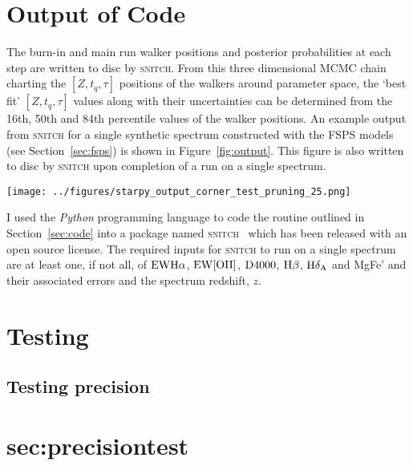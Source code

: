 \documentclass[useAMS,usenatbib]{mn2e}
\begin{document}
\section{Output of Code}\label{sec:output}

The burn-in and main run walker positions and posterior probabilities at each step are written to disc by \textsc{snitch}. From this three dimensional MCMC chain charting the $[Z, t_q, \tau]$ positions of the walkers around parameter space, the `best fit' $[Z, t_q, \tau]$ values along with their uncertainties can be determined from the 16th, 50th and 84th percentile values of the walker positions. An example output from \textsc{snitch} for a single synthetic spectrum constructed with the FSPS models (see Section~\ref{sec:fsps}) is shown in Figure~\ref{fig:output}. This figure is also written to disc by \textsc{snitch} upon completion of a run on a single spectrum.  

\begin{figure*}
\centering
\texttt{[image: ../figures/starpy\_output\_corner\_test\_pruning\_25.png]}
\caption{Example output from \textsc{snitch} showing the posterior probability function traced by the MCMC walkers across the three dimensional parameter space $[Z, t_q, \tau]$. Dashed lines show the 18th, 50th and 64th percentile of each distribution function which can be interpreted as the `best fit' with $±1\sigma$. The blue lines show the known true values which \textsc{snitch} has managed to recover.}
\label{fig:output}
\end{figure*}

I used the \emph{Python} programming language to code the routine outlined in Section~\ref{sec:code} into a package named \textsc{snitch} ~which has been released with an open source license. The required inputs for \textsc{snitch} to run on a single spectrum are at least one, if not all, of $\rm{EW}H\alpha$, $\rm{EW}[OII]$, $\rm{D}4000$, $\rm{H}\beta$, $\rm{H}\delta_A$ and MgFe' and their associated errors and the spectrum redshift, $z$. 

\section{Testing}\label{sec:test}

\subsection{Testing precision}\section{sec:precisiontest}
\end{document}
